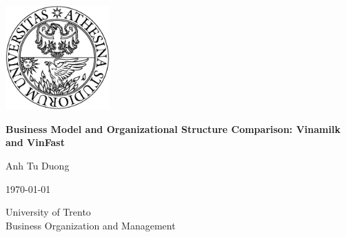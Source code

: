 \begin{titlepage}
    \centering %
    
    \vspace*{1cm}
    \includegraphics[width=0.3\textwidth]{figures/unitn-logo.png}
    
    \vfill 
    
    {\LARGE\bfseries Business Model and Organizational Structure Comparison: Vinamilk and VinFast \par}
    
    \vspace{1.5cm} 
    
    {\large Anh Tu Duong \par}
    
    \vspace{1cm} 
    
    {\normalsize 
    \today \par
    }
    
    \vfill 
    
    {\small
    University of Trento \\
    Business Organization and Management \\
    }
    \vspace*{1cm}

\end{titlepage}
